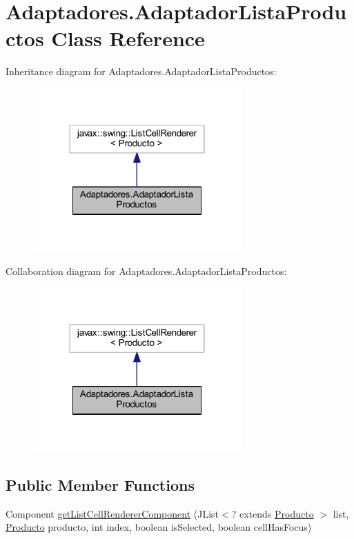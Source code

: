 \hypertarget{class_adaptadores_1_1_adaptador_lista_productos}{}\section{Adaptadores.\+Adaptador\+Lista\+Productos Class Reference}
\label{class_adaptadores_1_1_adaptador_lista_productos}


Inheritance diagram for Adaptadores.\+Adaptador\+Lista\+Productos\+:\nopagebreak
\begin{figure}[H]
\begin{center}
\leavevmode
\includegraphics[width=226pt]{class_adaptadores_1_1_adaptador_lista_productos__inherit__graph}
\end{center}
\end{figure}


Collaboration diagram for Adaptadores.\+Adaptador\+Lista\+Productos\+:\nopagebreak
\begin{figure}[H]
\begin{center}
\leavevmode
\includegraphics[width=226pt]{class_adaptadores_1_1_adaptador_lista_productos__coll__graph}
\end{center}
\end{figure}
\subsection*{Public Member Functions}
\begin{DoxyCompactItemize}
\item 
Component \mbox{\hyperlink{class_adaptadores_1_1_adaptador_lista_productos_ab58cd86bdd4c0009417f373521c6cfc4}{get\+List\+Cell\+Renderer\+Component}} (J\+List$<$? extends \mbox{\hyperlink{class_productos_1_1_producto}{Producto}} $>$ list, \mbox{\hyperlink{class_productos_1_1_producto}{Producto}} producto, int index, boolean is\+Selected, boolean cell\+Has\+Focus)
\end{DoxyCompactItemize}


